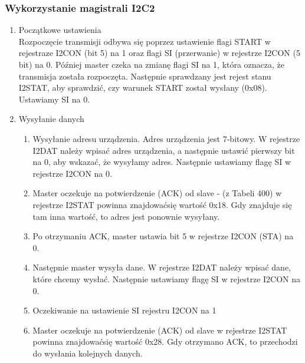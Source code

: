 \subsubsection{Wykorzystanie magistrali I2C2}
\begin{enumerate}
    \item Początkowe ustawienia\\
        Rozpoczęcie transmisji odbywa się poprzez ustawienie flagi START w rejestraze I2CON (bit 5) na 1 oraz flagi SI (przerwanie) w rejestrze I2CON (5 bit) na 0. Później master czeka na zmianę flagi SI na 1, która oznacza, że transmisja została rozpoczęta. Następnie sprawdzany jest rejest stanu I2STAT, aby sprawdzić, czy warunek START został wysłany (0x08). Ustawiamy SI na 0.
    \item Wysyłanie danych\\
    \begin{enumerate}
        \item Wysyłanie adresu urządzenia. Adres urządzenia jest 7-bitowy. W rejestrze I2DAT należy wpisać adres urządzenia, a następnie ustawić pierwszy bit na 0, aby wskazać, że wysyłamy adres. Następnie ustawiamy flagę SI w rejestrze I2CON na 0.
        \item Master oczekuje na potwierdzenie (ACK) od slave - (z Tabeli 400) w rejestrze I2STAT powinna znajdowaćsię wartość 0x18. Gdy znajduje się tam inna wartość, to adres jest ponownie wysyłany.
        \item Po otrzymaniu ACK, master ustawia bit 5 w rejestrze I2CON (STA) na 0.
        \item Następnie master wysyła dane. W rejestrze I2DAT należy wpisać dane, które chcemy wysłać. Następnie ustawiamy flagę SI w rejestrze I2CON na 0.
        \item Oczekiwanie na ustawienie SI rejestru I2CON na 1
        \item Master oczekuje na potwierdzenie (ACK) od slave w rejestrze I2STAT powinna znajdowaćsię wartość 0x28. Gdy otrzymano ACK, to przechodzi do wysłania kolejnych danych.
    \end{enumerate}
    

\end{enumerate}
